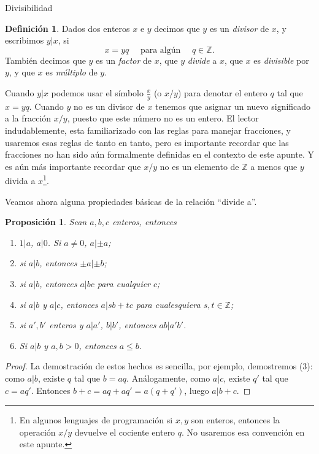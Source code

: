 \documentclass[11pt,spanish,makeidx]{amsbook}
\newtheorem{proposicion}[teorema]{Proposici\'on}
\theoremstyle{definition}
\newtheorem{definicion}{Definici\'on}[section]
\theoremstyle{remark}
\begin{document}
\begin{section}{Divisibilidad}\label{1.6}

\begin{definicion}Dados dos enteros $x$ e $y$ decimos que $y$ es un {\em divisor} de $x$, y escribimos $y|x$, si
$$
x=yq\quad\text{ para algún }\quad q\in \mathbb Z.
$$
También decimos que $y$ es un {\em factor} de $x$, que $y$ {\em divide} a $x$, que $x$ es {\em divisible} por $y$, y que $x$ es {\em múltiplo} de $y$.
\end{definicion}

Cuando $y|x$ podemos usar el símbolo $\frac{x}{y}$ (o $x/y$) para denotar el entero $q$ tal que $ x=yq$. Cuando $y$ no es un divisor de $x$ tenemos que asignar un nuevo significado a la fracción $x/y$, puesto que este número no es un entero. El lector indudablemente, esta familiarizado con las reglas para manejar fracciones, y usaremos esas reglas de tanto en tanto, pero es importante recordar que las fracciones no han sido aún formalmente definidas en el contexto de este apunte. Y es aún más importante recordar que $x/y$ no es un elemento de $\mathbb Z$ a menos que $y$ divida a $x$\footnote{En algunos lenguajes de programación si $x,y$ son enteros, entonces la operación $x/y$ devuelve el cociente entero $q$. No usaremos esa convención en este apunte.}.

Veamos ahora alguna propiedades básicas de la relación ``divide a''. 

\begin{proposicion}\label{prop-divide-a-propiedades}Sean $a,b,c$ enteros, entonces
\begin{enumerate}%
\item $1|a$, $a|0$. Si $a\not=0$,  $a|\pm a$;
\item si $a|b$, entonces $\pm a| \pm b$;
\item si $a|b$, entonces $a|bc$ para cualquier $c$;
\item\label{prop-divide-a-propiedades-item-4} si $a|b$ y $a|c$, entonces $a|sb+tc$ para cualesquiera $s,t \in \mathbb Z$;
\item\label{prop-divide-a-propiedades-item-5} si $a',b'$ enteros y $a|a'$, $b|b'$, entonces $ab|a'b'$.
\item\label{prop-divide-a-propiedades-item-6} Si $a|b$ y $a,b>0$,  entonces $a \le b$.
\end{enumerate}
\end{proposicion}
\begin{proof}
	La demostración de estos hechos es sencilla, por ejemplo, demostremos (3): como $a|b$, existe $q$ tal que $b = aq$. Análogamente, como $a|c$, existe $q'$ tal que $c = aq'$. Entonces $b+c = aq+aq' = a(q+q')$, luego $a|b+c$.  


\end{proof}
\end{section}
\end{document}
